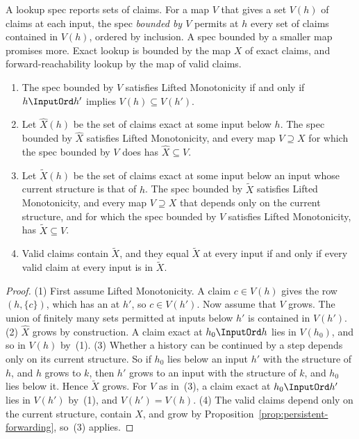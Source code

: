 A lookup spec reports sets of claims.  For a map $V$ that gives a set $V(h)$
of claims at each input, the spec \emph{bounded by $V$} permits at $h$ every
set of claims contained in $V(h)$, ordered by inclusion.  A spec bounded by a
smaller map promises more.  Exact lookup is bounded by the map $X$ of exact
claims, and forward-reachability lookup by the map of valid claims.

\begin{proposition}
\label{prop:remembered-claims}
\leavevmode
\begin{enumerate}
  \item The spec bounded by $V$ satisfies Lifted Monotonicity if and only if
        $h\InputOrd h'$ implies $V(h)\subseteq V(h')$.
  \item Let $\widehat X(h)$ be the set of claims exact at some input below
        $h$.  The spec bounded by $\widehat X$ satisfies Lifted Monotonicity,
        and every map $V\supseteq X$ for which the spec bounded by $V$ does
        has $\widehat X\subseteq V$.
  \item Let $\widetilde X(h)$ be the set of claims exact at some input below an
        input whose current structure is that of $h$.  The spec bounded by
        $\widetilde X$ satisfies Lifted Monotonicity, and every map
        $V\supseteq X$ that depends only on the current structure, and for
        which the spec bounded by $V$ satisfies Lifted Monotonicity, has
        $\widetilde X\subseteq V$.
  \item Valid claims contain $\widetilde X$, and they equal $\widetilde X$ at
        every input if and only if every valid claim at every input is in
        $\widetilde X$.
\end{enumerate}
\end{proposition}

\begin{proof}
(1) First assume Lifted Monotonicity.  A claim $c\in V(h)$ gives the row
$(h,\{c\})$, which has an \outnoun at $h'$, so $c\in V(h')$.  Now assume that
$V$ grows.  The union of finitely many sets permitted at inputs below $h'$ is
contained in $V(h')$.  (2) $\widehat X$ grows by construction.  A claim exact
at $h_0\InputOrd h$ lies in $V(h_0)$, and so in $V(h)$ by~(1).  (3) Whether a
history can be continued by a step depends only on its current structure.  So
if $h_0$ lies below an input $h'$ with the structure of $h$, and $h$ grows to
$k$, then $h'$ grows to an input with the structure of $k$, and $h_0$ lies
below it.  Hence $\widetilde X$ grows.  For $V$ as in~(3), a claim exact at
$h_0\InputOrd h'$ lies in $V(h')$ by~(1), and $V(h')=V(h)$.  (4) The valid
claims depend only on the current structure, contain $X$, and grow by
Proposition~\ref{prop:persistent-forwarding}, so~(3) applies.
\end{proof}

